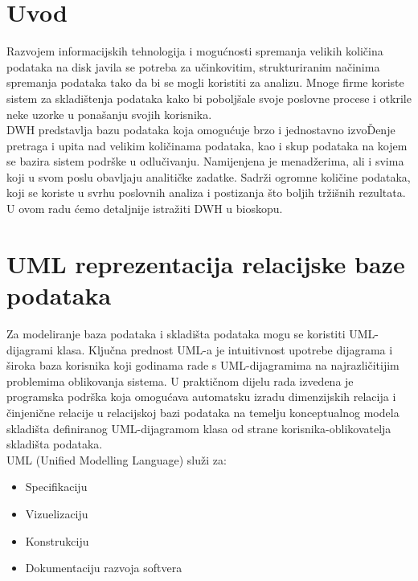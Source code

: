 \documentclass[12pt,table,xcdraw]{article}
\begin{document}
 

\thispagestyle{empty}		%

\printtitle					%

\printauthor				%

\newpage
\hypersetup{linkcolor=black}

\section{Uvod}

Razvojem informacijskih tehnologija i mogućnosti spremanja velikih količina podataka na disk javila se potreba za učinkovitim, strukturiranim načinima spremanja podataka tako da bi se mogli koristiti za analizu. Mnoge firme koriste sistem za skladištenja podataka kako bi poboljšale svoje poslovne procese i otkrile neke uzorke u ponašanju svojih korisnika. \\

DWH predstavlja bazu podataka koja omogućuje brzo i jednostavno izvoĎenje pretraga i upita nad velikim količinama podataka, kao i skup podataka na kojem se bazira sistem podrške u odlučivanju. Namijenjena je menadžerima, ali i svima koji u svom poslu obavljaju analitičke zadatke. Sadrži ogromne količine podataka, koji se koriste u svrhu poslovnih analiza i postizanja što boljih tržišnih rezultata. \\

U ovom radu ćemo detaljnije istražiti DWH u bioskopu.

\newpage

\section{UML reprezentacija relacijske baze podataka}

 Za modeliranje baza podataka i skladišta podataka mogu se koristiti UML-dijagrami klasa. Ključna prednost UML-a je intuitivnost upotrebe dijagrama i široka baza korisnika koji godinama rade s UML-dijagramima na najrazličitijim problemima oblikovanja sistema. U praktičnom dijelu rada izvedena je programska podrška koja omogućava automatsku izradu dimenzijskih relacija i činjenične relacije u relacijskoj bazi podataka na temelju konceptualnog modela skladišta definiranog UML-dijagramom klasa od strane korisnika-oblikovatelja skladišta podataka. \\
UML (Unified Modelling Language) služi za:
\begin{itemize}
\item Specifikaciju
\item Vizuelizaciju
\item Konstrukciju
\item Dokumentaciju razvoja softvera
\end{itemize}
\end{document}
